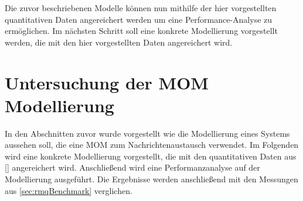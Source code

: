 Die zuvor beschriebenen Modelle können nun mithilfe der hier vorgestellten quantitativen Daten angereichert werden um eine Performance-Analyse zu ermöglichen. Im nächsten Schritt soll eine konkrete Modellierung vorgestellt werden, die mit den hier vorgestellten Daten angereichert wird. 










\section{Untersuchung der MOM Modellierung}
In den Abschnitten zuvor wurde vorgestellt wie die Modellierung eines Systems aussehen soll, die eine MOM zum Nachrichtenaustausch verwendet. Im Folgenden wird eine konkrete Modellierung vorgestellt, die mit den quantitativen Daten aus \autoref{} angereichert wird. Anschließend wird eine Performanzanalyse auf der Modellierung ausgeführt. Die Ergebnisse werden anschließend mit den Messungen aus \autoref{sec:rmqBenchmark} verglichen.


